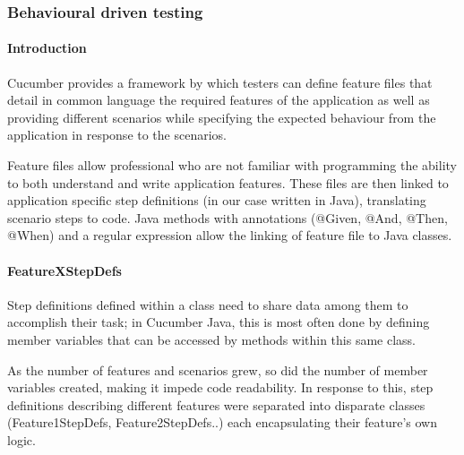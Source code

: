 \subsubsection{Behavioural driven testing}

\paragraph{Introduction}
Cucumber provides a framework by which testers can define feature files that detail in common language the required features of the application as well as providing different scenarios while specifying the expected behaviour from the application in response to the scenarios. 
\par 
Feature files allow professional who are not familiar with programming the ability to both understand and write application features. 
These files are then linked to application specific step definitions (in our case written in Java), translating scenario steps to code. Java methods with annotations (@Given, @And, @Then, @When) and a regular expression allow the linking of feature file to Java classes.  
\paragraph{FeatureXStepDefs}
Step definitions defined within a class need to share data among them to accomplish their task; in Cucumber Java, this is most often done by defining member variables that can be accessed by methods within this same class.  
\par 
As the number of features and scenarios grew, so did the number of member variables created, making it impede code readability. In response to this, step definitions describing different features were separated into disparate classes (Feature1StepDefs, Feature2StepDefs..) each encapsulating their feature's own logic.  
\par 
